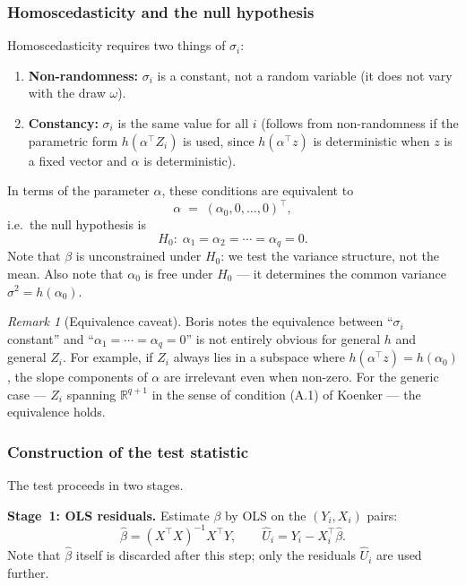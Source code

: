 \documentclass[a4paper,oneside,12pt]{extarticle}
\theoremstyle{plain}
\theoremstyle{definition}
\theoremstyle{remark}
\newtheorem{remark}[proposition]{Remark}
\begin{document}
\subsubsection*{Homoscedasticity and the null hypothesis}

Homoscedasticity requires two things of $\sigma_i$:
\begin{enumerate}
\item \textbf{Non-randomness:} $\sigma_i$ is a constant, not a random
  variable (it does not vary with the draw $\omega$).
\item \textbf{Constancy:} $\sigma_i$ is the same value for all $i$
  (follows from non-randomness if the parametric form $h(\alpha^\top
  Z_i)$ is used, since $h(\alpha^\top z)$ is deterministic when $z$ is
  a fixed vector and $\alpha$ is deterministic).
\end{enumerate}
In terms of the parameter $\alpha$, these conditions are equivalent to
\[
  \alpha \;=\; (\alpha_0, 0, \ldots, 0)^\top,
\]
i.e.\ the null hypothesis is
\[
  H_0:\; \alpha_1 = \alpha_2 = \cdots = \alpha_q = 0.
\]
Note that $\beta$ is unconstrained under $H_0$: we test the variance
structure, not the mean.  Also note that $\alpha_0$ is free under $H_0$
— it determines the common variance $\sigma^2 = h(\alpha_0)$.

\begin{remark}[Equivalence caveat]
Boris notes the equivalence between ``$\sigma_i$ constant'' and
``$\alpha_1 = \cdots = \alpha_q = 0$'' is not entirely obvious for
general $h$ and general $Z_i$.  For example, if $Z_i$ always lies in
a subspace where $h(\alpha^\top z) = h(\alpha_0)$, the slope
components of $\alpha$ are irrelevant even when non-zero.  For the
generic case — $Z_i$ spanning $\mathbb{R}^{q+1}$ in the sense of
condition (A.1) of Koenker — the equivalence holds.
\end{remark}

\subsubsection*{Construction of the test statistic}

The test proceeds in two stages.

\textbf{Stage~1: OLS residuals.}  Estimate $\beta$ by OLS on the
$(Y_i, X_i)$ pairs:
\[
  \hat\beta = (X^\top X)^{-1}X^\top Y,
  \qquad
  \hat U_i = Y_i - X_i^\top\hat\beta.
\]
Note that $\hat\beta$ itself is discarded after this step; only the
residuals $\hat U_i$ are used further.
\end{document}
